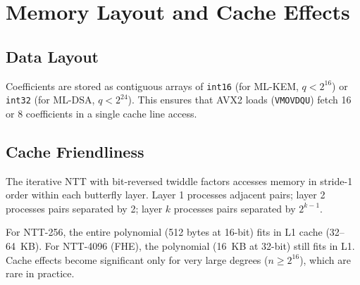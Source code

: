 \section{Memory Layout and Cache Effects}


\subsection{Data Layout}

Coefficients are stored as contiguous arrays of \texttt{int16} (for ML-KEM, $q < 2^{16}$)
or \texttt{int32} (for ML-DSA, $q < 2^{24}$). This ensures that AVX2 loads (\texttt{VMOVDQU})
fetch 16 or 8 coefficients in a single cache line access.

\subsection{Cache Friendliness}

The iterative NTT with bit-reversed twiddle factors accesses memory in stride-1 order
within each butterfly layer. Layer 1 processes adjacent pairs; layer 2 processes pairs
separated by 2; layer $k$ processes pairs separated by $2^{k-1}$.

For NTT-256, the entire polynomial (512 bytes at 16-bit) fits in L1 cache (32--64~KB).
For NTT-4096 (FHE), the polynomial (16~KB at 32-bit) still fits in L1. Cache effects
become significant only for very large degrees ($n \geq 2^{16}$), which are rare in
practice.

